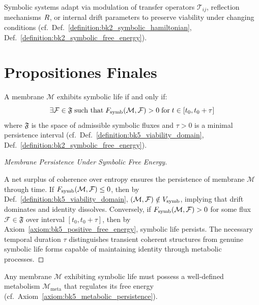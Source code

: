 \begin{axiom}[Adaptation]
\label{axiom:bk5_adaptation}
Symbolic systems adapt via modulation of transfer operators $\mathcal{T}_{ij}$, reflection mechanisms $R$, or internal drift parameters to preserve viability under changing conditions (cf.~Def.~\ref{definition:bk2_symbolic_hamiltonian}, Def.~\ref{definition:bk2_symbolic_free_energy}).
\end{axiom}

\section{Propositiones Finales}
\label{sec:bk5_propositiones_finales}

\begin{proposition}
\label{proposition:bk5_symbolic_life_criterion}
A membrane $\mathcal{M}$ exhibits symbolic life if and only if:
\begin{equation}
\exists \mathcal{F} \in \mathfrak{F} \; \text{such that} \; F_{\mathrm{symb}}(\mathcal{M}, \mathcal{F}) > 0 \; \text{for} \; t \in [t_0, t_0 + \tau]
\end{equation}
\noindent where $\mathfrak{F}$ is the space of admissible symbolic fluxes and $\tau > 0$ is a minimal persistence interval (cf.~Def.~\ref{definition:bk5_viability_domain}, Def.~\ref{definition:bk2_symbolic_free_energy}).
\end{proposition}

\begin{proof}[Membrane Persistence Under Symbolic Free Energy]
\label{proof:bk5_membrane_persistence_under_free_energy}
\leavevmode

A net surplus of coherence over entropy ensures the persistence of membrane $\mathcal{M}$ through time. If $F_{\mathrm{symb}}(\mathcal{M}, \mathcal{F}) \leq 0$, then by Def.~\ref{definition:bk5_viability_domain}, $(\mathcal{M}, \mathcal{F}) \notin V_{\mathrm{symb}}$, implying that drift dominates and identity dissolves.
Conversely, if $F_{\mathrm{symb}}(\mathcal{M}, \mathcal{F}) > 0$ for some flux $\mathcal{F} \in \mathfrak{F}$ over interval $[t_0, t_0 + \tau]$, then by Axiom~\ref{axiom:bk5_positive_free_energy}, symbolic life persists. The necessary temporal duration $\tau$ distinguishes transient coherent structures from genuine symbolic life forms capable of maintaining identity through metabolic processes.
\end{proof}

\begin{corollary}
\label{corollary:bk5_metabolic_necessity}
Any membrane $\mathcal{M}$ exhibiting symbolic life must possess a well-defined metabolism $\mathcal{M}_{\mathrm{meta}}$ that regulates its free energy (cf.~Axiom~\ref{axiom:bk5_metabolic_persistence}).
\end{corollary}

